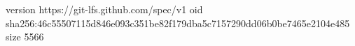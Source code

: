 version https://git-lfs.github.com/spec/v1
oid sha256:46c55507115d846e093c351be82f179dba5c7157290dd06b0be7465e2104e485
size 5566
